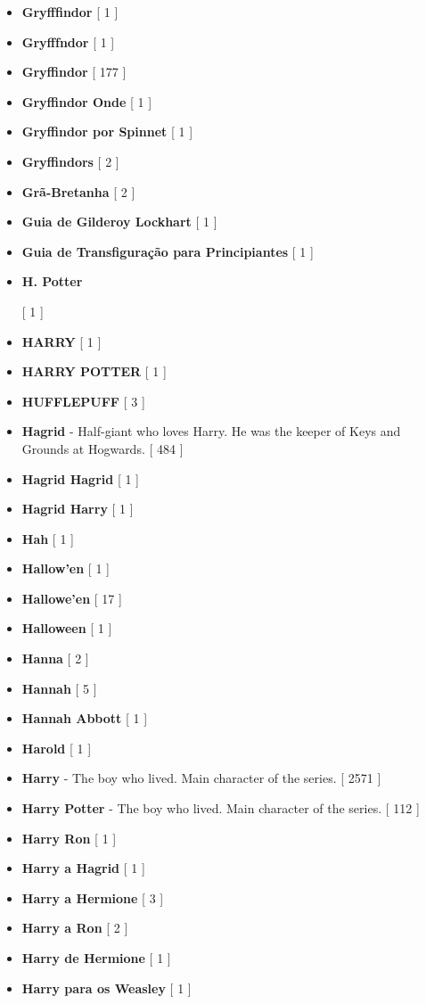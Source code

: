 \documentclass[a4paper]{article}
\begin{document}
\begin{itemize}
	\item \textbf{Gryfffindor} [ 1 ]
	\item \textbf{Gryfffndor} [ 1 ]
	\item \textbf{Gryffindor} [ 177 ]
	\item \textbf{Gryffindor Onde} [ 1 ]
	\item \textbf{Gryffindor por Spinnet} [ 1 ]
	\item \textbf{Gryffindors} [ 2 ]
	\item \textbf{Grã-Bretanha} [ 2 ]
	\item \textbf{Guia de Gilderoy Lockhart} [ 1 ]
	\item \textbf{Guia de Transfiguração para Principiantes} [ 1 ]
	\item \hypertarget{H}{\textbf{H. Potter}} [ 1 ]
	\item \textbf{HARRY} [ 1 ]
	\item \textbf{HARRY POTTER} [ 1 ]
	\item \textbf{HUFFLEPUFF} [ 3 ]
	\item \textbf{Hagrid} - Half-giant who loves Harry. He was the keeper of Keys and Grounds at Hogwards. [ 484 ]
	\item \textbf{Hagrid Hagrid} [ 1 ]
	\item \textbf{Hagrid Harry} [ 1 ]
	\item \textbf{Hah} [ 1 ]
	\item \textbf{Hallow'en} [ 1 ]
	\item \textbf{Hallowe'en} [ 17 ]
	\item \textbf{Halloween} [ 1 ]
	\item \textbf{Hanna} [ 2 ]
	\item \textbf{Hannah} [ 5 ]
	\item \textbf{Hannah Abbott} [ 1 ]
	\item \textbf{Harold} [ 1 ]
	\item \textbf{Harry} - The boy who lived. Main character of the series. [ 2571 ]
	\item \textbf{Harry Potter} - The boy who lived. Main character of the series. [ 112 ]
	\item \textbf{Harry Ron} [ 1 ]
	\item \textbf{Harry a Hagrid} [ 1 ]
	\item \textbf{Harry a Hermione} [ 3 ]
	\item \textbf{Harry a Ron} [ 2 ]
	\item \textbf{Harry de Hermione} [ 1 ]
	\item \textbf{Harry para os Weasley} [ 1 ]

\end{itemize}
\end{document}
